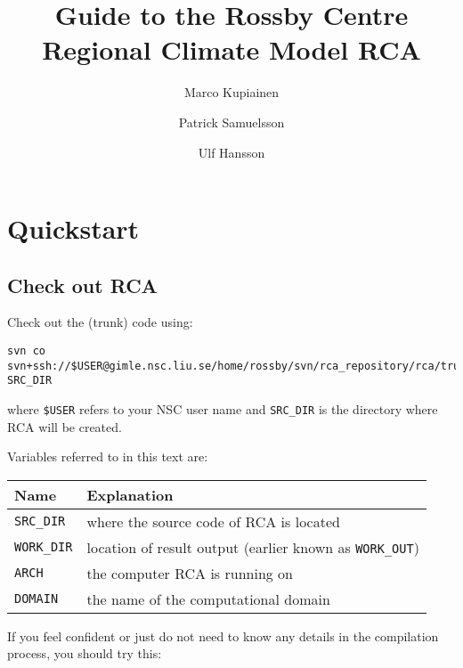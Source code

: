 \documentclass{article}
\title{Guide to the Rossby Centre Regional Climate Model RCA}
\author{Marco Kupiainen \and Patrick Samuelsson \and Ulf Hansson}
\begin{document}
\maketitle
\tableofcontents  
\newpage

\setlength{\parskip}{2mm}

\section{Quickstart}

\subsection{Check out RCA}

Check out the (trunk) code using:
\begin{verbatim}
svn co svn+ssh://$USER@gimle.nsc.liu.se/home/rossby/svn/rca_repository/rca/trunk SRC_DIR
\end{verbatim}
where \verb+$USER+ refers to your NSC user name and
\verb+SRC_DIR+ is the directory where RCA will be created. 

Variables referred to in this text are:

\begin{tabular}{|l|l|}
\hline 
Name & Explanation \\
\hline
\hline
\verb+SRC_DIR+ & where the source code of RCA is located \\
\verb+WORK_DIR+ & location of result output (earlier known as \verb+WORK_OUT+)\\
\verb+ARCH+ & the computer RCA is running on \\
\verb+DOMAIN+ & the name of the computational domain \\
\hline
\end{tabular}



If you feel confident or just do not need to know any details in the
compilation process, you should try this:
\end{document}
